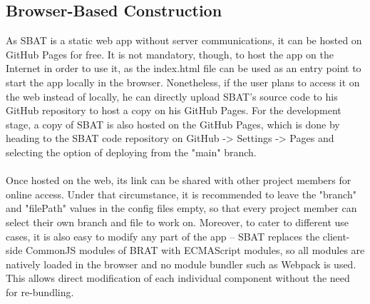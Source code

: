 \documentclass[12ptm a4paper]{article}
\begin{document}
\subsection{Browser-Based Construction}
As SBAT is a static web app without server communications, it can be hosted on GitHub Pages for free. It is not mandatory, though, to host the app on the Internet in order to use it, as the index.html file can be used as an entry point to start the app locally in the browser. Nonetheless, if the user plans to access it on the web instead of locally, he can directly upload SBAT's source code to his GitHub repository to host a copy on his GitHub Pages. For the development stage, a copy of SBAT is also hosted on the GitHub Pages, which is done by heading to the SBAT code repository on GitHub -> Settings -> Pages and selecting the option of deploying from the "main" branch.\\
\\
Once hosted on the web, its link can be shared with other project members for online access. Under that circumstance, it is recommended to leave the "branch" and "filePath" values in the config files empty, so that every project member can select their own branch and file to work on. Moreover, to cater to different use cases, it is also easy to modify any part of the app -- SBAT replaces the client-side CommonJS modules of BRAT with ECMAScript modules, so all modules are natively loaded in the browser and no module bundler such as Webpack is used. This allows direct modification of each individual component without the need for re-bundling.
\end{document}
